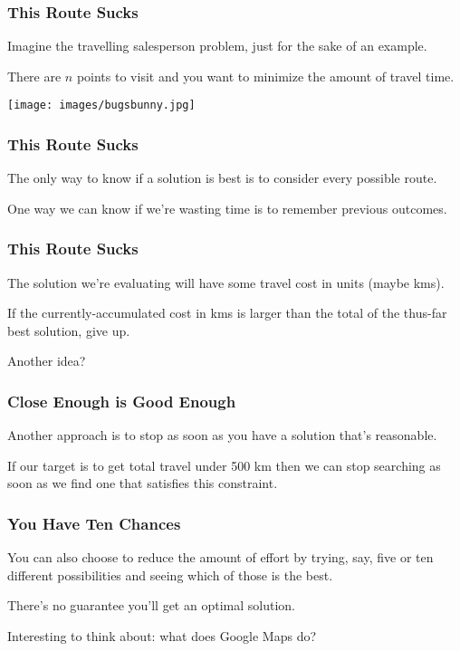 \begin{frame}
\frametitle{This Route Sucks}

Imagine the travelling salesperson problem, just for the sake of an example. 

There are $n$ points to visit and you want to minimize the amount of travel time. 

\begin{center}
	\texttt{[image: images/bugsbunny.jpg]}
\end{center}

\end{frame}


\begin{frame}
\frametitle{This Route Sucks}

The only way to know if a solution is best is to consider every possible route.

One way we can know if we're wasting time is to remember previous outcomes.

\end{frame}


\begin{frame}
\frametitle{This Route Sucks}

The solution we're evaluating will have some travel cost in units (maybe kms). 

If the currently-accumulated cost in kms is larger than the total of the thus-far best solution, give up. 

Another idea?

\end{frame}

\begin{frame}
\frametitle{Close Enough is Good Enough}

Another approach is to stop as soon as you have a solution that's reasonable. 

If our target is to get total travel under 500 km then we can stop searching as soon as we find one that satisfies this constraint.

\end{frame}

\begin{frame}
\frametitle{You Have Ten Chances}

You can also choose to reduce the amount of effort by trying, say, five or ten different possibilities and seeing which of those is the best.

There's no guarantee you'll get an optimal solution.

Interesting to think about: what does Google Maps do?

\end{frame}

